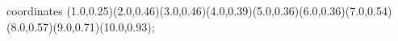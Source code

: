 					coordinates { (1.0,0.25)(2.0,0.46)(3.0,0.46)(4.0,0.39)(5.0,0.36)(6.0,0.36)(7.0,0.54)(8.0,0.57)(9.0,0.71)(10.0,0.93)};